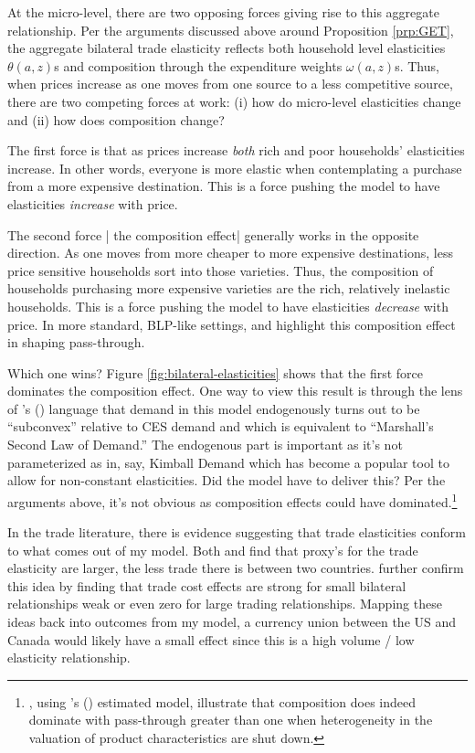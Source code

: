 \documentclass[12pt,pdftex]{article}
\def\citeapos#1{\citeauthor{#1}'s (\citeyear{#1})}
\begin{document}
\begin{onehalfspacing}
At the micro-level, there are two opposing forces giving rise to this aggregate relationship. Per the arguments discussed above around Proposition \ref{prp:GET}, the aggregate bilateral trade elasticity reflects both household level elasticities $\theta(a,z)$s and composition through the expenditure weights $\omega(a,z)$s. Thus, when prices increase as one moves from one source to a less competitive source, there are two competing forces at work: (i) how do micro-level elasticities change and (ii) how does composition change?

The first force is that as prices increase \emph{both} rich and poor households' elasticities increase. In other words, everyone is more elastic when contemplating a purchase from a more expensive destination. This is a force pushing the model to have elasticities \emph{increase} with price.

The second force | the composition effect| generally works in the opposite direction. As one moves from more cheaper to more expensive destinations, less price sensitive households sort into those varieties. Thus, the composition of households purchasing more expensive varieties are the rich, relatively inelastic households. This is a force pushing the model to have elasticities \emph{decrease} with price. In more standard, BLP-like settings, \citet{nakamura2010accounting} and \citet*{head2021poor} highlight this composition effect in shaping pass-through.

Which one wins? Figure \ref{fig:bilateral-elasticities} shows that the first force dominates the composition effect. One way to view this result is through the lens of \citeapos{mrazova2017not} language that demand in this model endogenously turns out to be ``subconvex'' relative to CES demand and which is equivalent to ``Marshall's Second Law of Demand.'' The endogenous part is important as it's not parameterized as in, say, Kimball Demand which has become a popular tool to allow for non-constant elasticities. Did the model have to deliver this? Per the arguments above, it's not obvious as composition effects could have dominated.\footnote{\citet{head2021poor}, using \citeapos{berry1995automobile} estimated model, illustrate that composition does indeed dominate with pass-through greater than one when heterogeneity in the valuation of product characteristics are shut down.}

In the trade literature, there is evidence suggesting that trade elasticities conform to what comes out of my model. Both \citet{novy2013international} and \citet*{carrere2020gravity} find that proxy's for the trade elasticity are larger, the less trade there is between two countries. \citet{chen2022gravity} further confirm this idea by finding that trade cost effects are strong for small bilateral relationships weak or even zero for large trading relationships. Mapping these ideas back into outcomes from my model, a currency union between the US and Canada would likely have a small effect since this is a high volume / low elasticity relationship.




\end{onehalfspacing}
\end{document}
